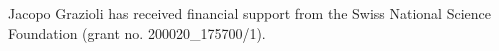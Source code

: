 \documentclass[draft]{agujournal2019}
\begin{document}











\acknowledgments
Jacopo Grazioli has received financial support from the Swiss National Science Foundation (grant no. 200020\_175700/1). 



%

%



%
\end{document}
